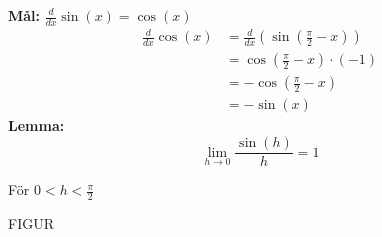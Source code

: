 \textbf{Mål: } $\frac{d}{dx}\sin(x) = \cos(x)$
\begin{align*}
    \frac{d}{dx}\cos(x) &= \frac{d}{dx}(\sin(\frac{\pi}{2} - x)) \\
    &= \cos(\frac{\pi}{2}-x) \cdot (-1)\\
    &= -\cos(\frac{\pi}{2}-x)\\
    &= -\sin(x)
\end{align*}
\textbf{Lemma: }
\[
\lim\limits_{h \to 0}\frac{\sin(h)}{h} = 1
\]
\begin{bevis}
    För $0 < h < \frac{\pi}{2}$
    \begin{center}
        FIGUR
    \end{center}
\end{bevis}



























